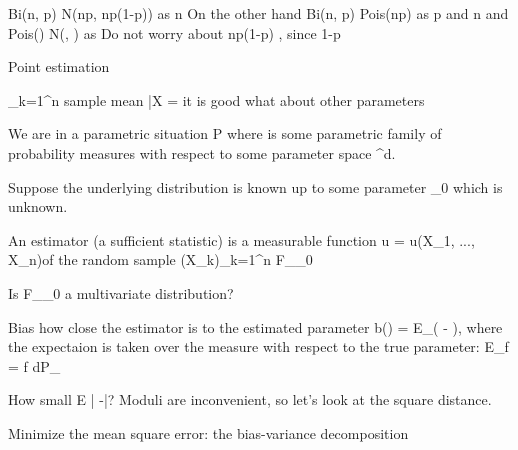 Bi(n, p) \to N(np, np(1-p)) as n\to \infty
On the other hand
Bi(n, p) \to Pois(np) as p and n\to \infty
and Pois(\lambda) \to N(\lambda, \lambda) as \lambda\to\infty
Do not worry about np(1-p) \neq \lambda, since 1-p 

Point estimation

_{k=1}^n
sample mean \bar{X} = 
it is good what about other parameters

We are in a parametric situation P\in {} where  is some
parametric family of probability measures with respect to some parameter space \Theta \subseteq \Real^d.

Suppose the underlying distribution is known up to some parameter \theta_0 which is unknown.

An estimator (a sufficient statistic) is a measurable function u = u(X_1, ..., X_n)of the random sample (X_k)_{k=1}^n \sym F_{\theta_0}

Is F_{\theta_0} a multivariate distribution?

Bias how close the estimator is to the estimated parameter
b(\hat{\theta}) = E_\theta(\hat{\theta} - \theta), where the expectaion is taken over the measure with respect to the true parameter: E_\theta f = \int f dP_\theta

How small E |\hat{\theta} -\theta|? Moduli are inconvenient, so let's look at the square distance.

Minimize the mean square error: the bias-variance decomposition

